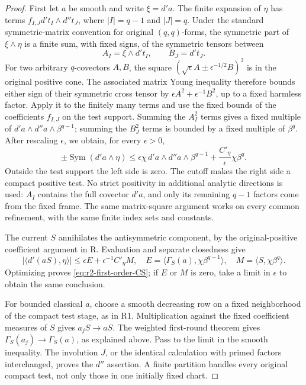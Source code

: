 \documentclass[11pt,a4paper]{article}
\numberwithin{equation}{section}
\theoremstyle{definition}
\theoremstyle{remark}
\begin{document}
\begin{proof}
First let $a$ be smooth and write $\xi=d'a$.
The finite expansion of $\eta$ has terms
$f_{I,J}d't_I\wedge d''t_J$, where $|I|=q-1$ and $|J|=q$.
Under the standard symmetric-matrix convention for original
$(q,q)$-forms, the symmetric part of $\xi\wedge\eta$ is a
finite sum, with fixed signs, of the symmetric tensors between
\[
 A_I=\xi\wedge d't_I,\qquad B_J=d't_J.
\]
For two arbitrary $q$-covectors $A,B$, the square
$(\sqrt\epsilon A\pm\epsilon^{-1/2}B)^2$ is in the original
positive cone. The associated matrix Young inequality therefore
bounds either sign of their symmetric cross tensor by
$\epsilon A^2+\epsilon^{-1}B^2$, up to a fixed harmless factor.
Apply it to the finitely many terms and use the fixed bounds of
the coefficients $f_{I,J}$ on the test support. Summing the
$A_I^2$ terms gives a fixed multiple of
$d'a\wedge d''a\wedge\beta^{q-1}$; summing the $B_J^2$ terms
is bounded by a fixed multiple of $\beta^q$.
After rescaling $\epsilon$, we obtain, for every $\epsilon>0$,
\[
 \pm\operatorname{Sym}(d'a\wedge\eta)
 \leq \epsilon\chi\,d'a\wedge d''a\wedge\beta^{q-1}
             +\frac{C'\!_\eta}{\epsilon}\chi\beta^q.
\]
Outside the test support the left side is zero. The cutoff makes
the right side a compact positive test. No strict positivity in
additional analytic directions is used: $A_I$ contains the full
covector $d'a$, and only its remaining $q-1$ factors come from
the fixed frame. The same matrix-square argument works on every
common refinement, with the same finite index sets and constants.

The current $S$ annihilates the antisymmetric component, by the
original-positive coefficient argument in R. Evaluation and
separate closedness give
\[
 |\langle d'(aS),\eta\rangle|
 \leq\epsilon E+\epsilon^{-1}C'\!_\eta M,
 \quad
 E=\langle\Gamma_S(a),\chi\beta^{q-1}\rangle,
 \quad M=\langle S,\chi\beta^q\rangle.
\]
Optimizing proves \eqref{eq:r2-first-order-CS}; if $E$ or $M$
is zero, take a limit in $\epsilon$ to obtain the same conclusion.

For bounded classical $a$, choose a smooth decreasing row on
a fixed neighborhood of the compact test stage, as in R1.
Multiplication against the fixed coefficient measures of $S$
gives $a_jS\to aS$. The weighted first-round theorem gives
$\Gamma_S(a_j)\to\Gamma_S(a)$, as explained above.
Pass to the limit in the smooth inequality. The involution $J$,
or the identical calculation with primed factors interchanged,
proves the $d''$ assertion. A finite partition handles every
original compact test, not only those in one initially fixed chart.
\end{proof}
\end{document}
